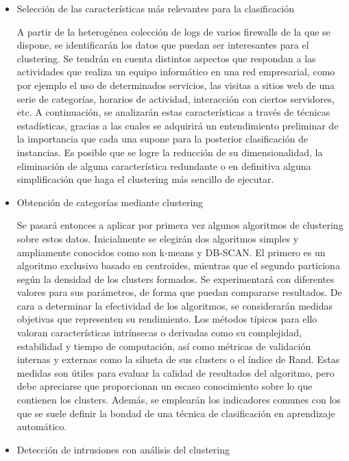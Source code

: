 \begin{itemize}

    \item Selección de las características más relevantes para la clasificación

A partir de la heterogénea colección de logs de varios firewalls de la que se dispone, se identificarán los datos que puedan ser interesantes para el clustering.
Se tendrán en cuenta distintos aspectos que respondan a las actividades que realiza un equipo informático en una red empresarial, como por ejemplo el uso de determinados servicios, las visitas a sitios web de una serie de categorías, horarios de actividad, interacción con ciertos servidores, etc.
A continuación, se analizarán estas características a través de técnicas estadísticas, gracias a las cuales se adquirirá un entendimiento preliminar de la importancia que cada una supone para la posterior clasificación de instancias.
Es posible que se logre la reducción de su dimensionalidad, la eliminación de alguna característica redundante o en definitiva alguna simplificación que haga el clustering más sencillo de ejecutar.

    \item Obtención de categorías mediante clustering

Se pasará entonces a aplicar por primera vez algunos algoritmos de clustering sobre estos datos.
Inicialmente se elegirán dos algoritmos simples y ampliamente conocidos como son k-means y DB-SCAN.
El primero es un algoritmo exclusivo basado en centroides, mientras que el segundo particiona según la densidad de los clusters formados.
Se experimentará con diferentes valores para sus parámetros, de forma que puedan compararse resultados.
De cara a determinar la efectividad de los algoritmos, se considerarán medidas objetivas que representen su rendimiento.
Los métodos típicos para ello valoran características intrínsecas o derivadas como su complejidad, estabilidad y tiempo de computación, así como métricas de validación internas y externas como la silueta de sus clusters o el índice de Rand.
Estas medidas son útiles para evaluar la calidad de resultados del algoritmo, pero debe apreciarse que proporcionan un escaso conocimiento sobre lo que contienen los clusters.
Además, se emplearán los indicadores comunes con los que se suele definir la bondad de una técnica de clasificación en aprendizaje automático.

    \item Detección de intrusiones con análisis del clustering


\end{itemize}
